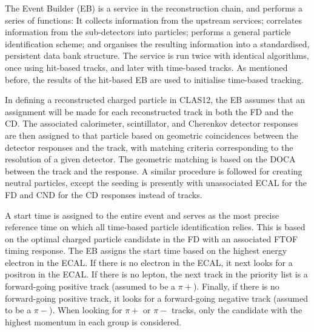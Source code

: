     The Event Builder (EB) is a service in the reconstruction chain, and performs a series of functions:
    It collects information from the upstream services; correlates information from the sub-detectors into particles; performs a general particle identification scheme; and organises the resulting information into a standardised, persistent data bank structure.
    The service is run twice with identical algorithms, once using hit-based tracks, and later with time-based tracks.
    As mentioned before, the results of the hit-based EB are used to initialise time-based tracking.

    In defining a reconstructed charged particle in CLAS12, the EB assumes that an assignment will be made for each reconstructed track in both the FD and the CD.
    The associated calorimeter, scintillator, and Cherenkov detector responses are then assigned to that particle based on geometric coincidences between the detector responses and the track, with matching criteria corresponding to the resolution of a given detector.
    The geometric matching is based on the DOCA between the track and the response.
    A similar procedure is followed for creating neutral particles, except the seeding is presently with unassociated ECAL for the FD and CND for the CD responses instead of tracks.

    A start time is assigned to the entire event and serves as the most precise reference time on which all time-based particle identification relies.
    This is based on the optimal charged particle candidate in the FD with an associated FTOF timing response.
    The EB assigns the start time based on the highest energy electron in the ECAL.
    If there is no electron in the ECAL, it next looks for a positron in the ECAL.
    If there is no lepton, the next track in the priority list is a forward-going positive track (assumed to be a $\pi+$).
    Finally, if there is no forward-going positive track, it looks for a forward-going negative
    track (assumed to be a $\pi-$).
    When looking for $\pi+$ or $\pi-$ tracks, only the candidate with the highest momentum in each group is considered.

